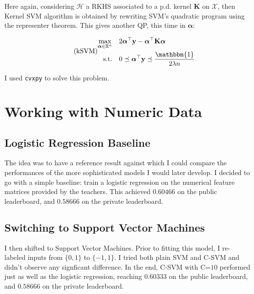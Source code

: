 \documentclass[final]{cvpr}
\begin{document}
	Here again, considering $\mathcal{H}$ a RKHS associated to a p.d. kernel $\mathbf{K}$ on $\mathcal{X}$, then Kernel SVM algorithm is obtained by rewriting SVM's quadratic program using the representer theorem. This gives another QP, this time in $\boldsymbol{\alpha}$:
	\vspace{-7mm}
	\begin{center}
			\begin{equation*}\tag{\text{kSVM}}
				\begin{aligned}
					\max_{\boldsymbol{\alpha} \in \mathbb{R}^n} \quad & 2 \boldsymbol{\alpha}^{\top} \mathbf{y}-\boldsymbol{\alpha}^{\top} \mathbf{K} \boldsymbol{\alpha}\\
					\textrm{s.t.} \quad & 0  \preceq \boldsymbol{\alpha}^{\top} \mathbf{y} \preceq \dfrac{\mathbbm{1}}{2 \lambda n} 
				\end{aligned}                                      
			\end{equation*}	
	\end{center}
	\noindent
	I used \texttt{cvxpy} to solve this problem.
	
	
	\section{Working with Numeric Data}
	
	\subsection{Logistic Regression Baseline}
	
	The idea was to have a reference result against which I could compare the performances of the more sophisticated models I would later develop. I decided to go with a simple baseline: train a logistic regression on the numerical feature matrices provided by the teachers. This achieved $0.60466$ on the public leaderboard, and $0.58666$ on the private leaderboard.
	
	\subsection{Switching to Support Vector Machines}
	
	I then shifted to Support Vector Machines. Prior to fitting this model, I re-labeled inputs from $\{0, 1\}$ to $\{ -1, 1\}$. I tried both plain SVM and C-SVM and didn't observe any signficant difference. In the end, C-SVM with C=$10$ performed just as well as the logistic regression, reaching $0.60333$ on the public leaderboard, and $0.58666$ on the private leaderboard.
	
\end{document}
